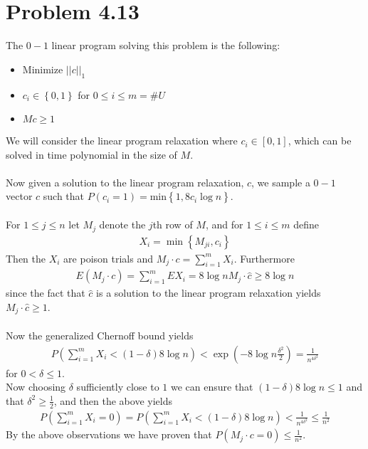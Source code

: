 \section*{Problem 4.13}
The $0-1$ linear program solving this problem is the following:
\begin{itemize}
	\item Minimize $||c||_1$
	\item $c_i \in \left\{ 0,1 \right\}$ for $0 \leq i \leq m=\#U$
	\item $Mc \geq 1$
\end{itemize}
We will consider the linear program relaxation where $c_i \in \left[ 0,1 \right]$, 
which can be solved in time polynomial in the size of $M$. \\ \\
Now given a solution to the linear program relaxation, $\widehat{c}$, 
we sample a $0-1$ vector $c$ such that $P(c_i=1)=\text{min}\left\{ 1, 8\widehat{c_i} \log n \right\}$. \\ \\
For $1 \leq j \leq n$ let $M_j$ denote the $j$th row of $M$,
and for $1 \leq i \leq m$ define 
\begin{align*}
	X_i=\min\left\{ M_{ji}, c_i \right\}
\end{align*}
Then the $X_i$ are poison trials and $M_j \cdot c= \sum_{i=1}^m X_i$. Furthermore
\begin{align*}
	E\left( M_j \cdot c \right)=\sum_{i=1}^{m}EX_i=8 \log n M_j\cdot \widehat{c} \geq 8 \log n
\end{align*}
since the fact that $\widehat{c}$ is a solution to the linear program relaxation yields $M_j \cdot \widehat{c} \geq 1$. \\ \\
Now the generalized Chernoff bound yields
\begin{align*}
	P\left( \sum_{i=1}^{m}X_i < (1-\delta)8 \log n \right) 
	< \exp\left( -8 \log n \frac{\delta^2}{2} \right)
	= \frac{1}{n^{4\delta^2}}
\end{align*}
for $0 < \delta \leq 1$. \\
Now choosing $\delta$ sufficiently close to $1$ we can ensure that 
$\left( 1-\delta \right)8 \log n \leq 1$ and that
$\delta^2 \geq \frac{1}{2}$, and then the above yields
\begin{align*}
	P\left( \sum_{i=1}^{m}X_i =0 \right)=P\left( \sum_{i=1}^{m}X_i<(1-\delta)8 \log n \right)
	<\frac{1}{n^{4\delta^2}} \leq \frac{1}{n^2}
\end{align*}
By the above observations we have proven that $P(M_j \cdot c=0) \leq \frac{1}{n^2}$. \\ 
